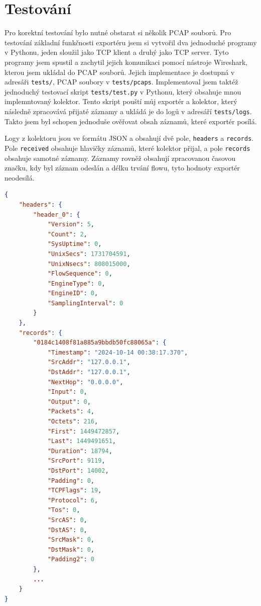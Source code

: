 \documentclass[a4paper, 11pt]{article}
\begin{document}
\begin{sloppypar}
\section{Testování}
Pro korektní testování bylo nutné obstarat si několik PCAP souborů. Pro testování základní funkčnosti exportéru jsem si vytvořil dva jednoduché programy v Pythonu, jeden sloužil jako TCP klient a druhý jako TCP server. Tyto programy jsem spustil a zachytil jejich komunikaci pomocí nástroje Wireshark, kterou jsem ukládal do PCAP souborů. Jejich implementace je dostupná v adresáři \texttt{tests/}, PCAP soubory v \texttt{tests/pcaps}. Implementoval jsem taktéž jednoduchý testovací skript \texttt{tests/test.py} v Pythonu, který obsahuje mnou implemntovaný kolektor. Tento skript pouští můj exportér a kolektor, který následně zpracovává přijaté záznamy a ukládá je do logů v adresáří \texttt{tests/logs}. Takto jsem byl schopen jednoduše ověřovat obsah záznamů, které exportér posílá.

Logy z kolektoru jsou ve formátu JSON a obsahují dvě pole, \texttt{headers} a \texttt{records}. Pole \texttt{received} obsahuje hlavičky záznamů, které kolektor přijal, a pole \texttt{records} obsahuje samotné záznamy. Záznamy rovněž obsahují zpracovanou časovou značku, kdy byl záznam odeslán a délku trvání flowu, tyto hodnoty exportér neodesílá.

\begin{lstlisting}[language=json, caption={Ukázka logu z kolektoru}, label={lst1}]
{
    "headers": {
        "header_0": {
            "Version": 5,
            "Count": 2,
            "SysUptime": 0,
            "UnixSecs": 1731704591,
            "UnixNsecs": 808015000,
            "FlowSequence": 0,
            "EngineType": 0,
            "EngineID": 0,
            "SamplingInterval": 0
        }
    },
    "records": {
        "0184c1408f81a885a9bbdb50fc88065a": {
            "Timestamp": "2024-10-14 00:38:17.370",
            "SrcAddr": "127.0.0.1",
            "DstAddr": "127.0.0.1",
            "NextHop": "0.0.0.0",
            "Input": 0,
            "Output": 0,
            "Packets": 4,
            "Octets": 216,
            "First": 1449472857,
            "Last": 1449491651,
            "Duration": 18794,
            "SrcPort": 9119,
            "DstPort": 14002,
            "Padding": 0,
            "TCPFlags": 19,
            "Protocol": 6,
            "Tos": 0,
            "SrcAS": 0,
            "DstAS": 0,
            "SrcMask": 0,
            "DstMask": 0,
            "Padding2": 0
        },
        ...
    }
}


\end{lstlisting}
\end{sloppypar}
\end{document}
